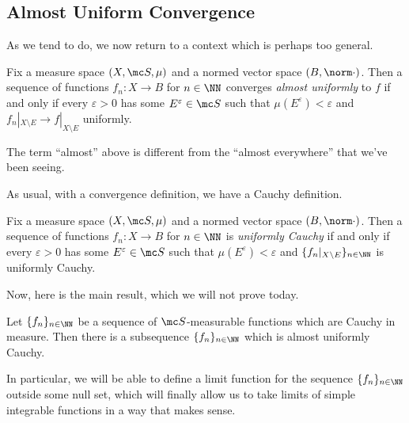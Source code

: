 \documentclass[../notes.tex]{subfiles}
\begin{document}
\subsection{Almost Uniform Convergence}
As we tend to do, we now return to a context which is perhaps too general.
\begin{definition}
	Fix a measure space $(X,\mc S,\mu)$ and a normed vector space $(B,\norm\cdot)$. Then a sequence of functions $f_n\colon X\to B$ for $n\in\NN$ converges \textit{almost uniformly} to $f$ if and only if every $\varepsilon>0$ has some $E^\varepsilon\in\mc S$ such that $\mu(E^\varepsilon)<\varepsilon$ and $f_n|_{X\setminus E}\to f|_{X\setminus E}$ uniformly.
\end{definition}
\begin{remark}
	The term ``almost'' above is different from the ``almost everywhere'' that we've been seeing.
\end{remark}
As usual, with a convergence definition, we have a Cauchy definition.
\begin{definition}
	Fix a measure space $(X,\mc S,\mu)$ and a normed vector space $(B,\norm\cdot)$. Then a sequence of functions $f_n\colon X\to B$ for $n\in\NN$ is \textit{uniformly Cauchy} if and only if every $\varepsilon>0$ has some $E^\varepsilon\in\mc S$ such that $\mu(E^\varepsilon)<\varepsilon$ and $\{f_n|_{X\setminus E}\}_{n\in\NN}$ is uniformly Cauchy.
\end{definition}
Now, here is the main result, which we will not prove today.
\begin{theorem}
	Let $\{f_n\}_{n\in\NN}$ be a sequence of $\mc S$-measurable functions which are Cauchy in measure. Then there is a subsequence $\{f_n\}_{n\in\NN}$ which is almost uniformly Cauchy.
\end{theorem}
In particular, we will be able to define a limit function for the sequence $\{f_n\}_{n\in\NN}$ outside some null set, which will finally allow us to take limits of simple integrable functions in a way that makes sense.
\end{document}
